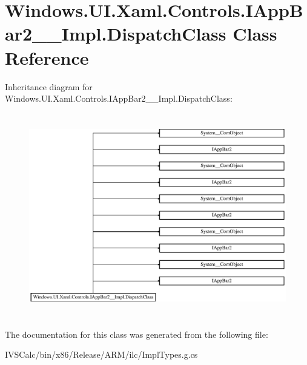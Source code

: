\hypertarget{class_windows_1_1_u_i_1_1_xaml_1_1_controls_1_1_i_app_bar2_____impl_1_1_dispatch_class}{}\section{Windows.\+U\+I.\+Xaml.\+Controls.\+I\+App\+Bar2\+\_\+\+\_\+\+Impl.\+Dispatch\+Class Class Reference}
\label{class_windows_1_1_u_i_1_1_xaml_1_1_controls_1_1_i_app_bar2_____impl_1_1_dispatch_class}
Inheritance diagram for Windows.\+U\+I.\+Xaml.\+Controls.\+I\+App\+Bar2\+\_\+\+\_\+\+Impl.\+Dispatch\+Class\+:\begin{figure}[H]
\begin{center}
\leavevmode
\includegraphics[height=8.927536cm]{class_windows_1_1_u_i_1_1_xaml_1_1_controls_1_1_i_app_bar2_____impl_1_1_dispatch_class}
\end{center}
\end{figure}


The documentation for this class was generated from the following file\+:\begin{DoxyCompactItemize}
\item 
I\+V\+S\+Calc/bin/x86/\+Release/\+A\+R\+M/ilc/Impl\+Types.\+g.\+cs\end{DoxyCompactItemize}
